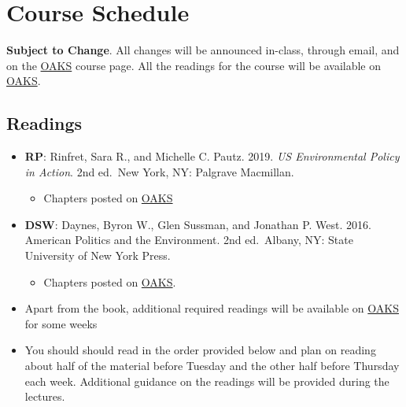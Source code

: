 \hypertarget{course-schedule}{%
\section{Course Schedule}\label{course-schedule}}

\textbf{Subject to Change}. All changes will be announced in-class,
through email, and on the \href{https://lms.cofc.edu}{OAKS} course page.
All the readings for the course will be available on
\href{https://lms.cofc.edu}{OAKS}.

\hypertarget{readings}{%
\subsection{Readings}\label{readings}}

\begin{itemize}
\item
  \faBook \hspace{0.005in} \textbf{RP}: Rinfret, Sara R., and Michelle
  C. Pautz. 2019. \emph{US Environmental Policy in Action}. 2nd ed.~New
  York, NY: Palgrave Macmillan.

  \begin{itemize}
  
  \item
    Chapters posted on \href{https://lms.cofc.edu}{OAKS}
  \end{itemize}
\item
  \faBook \hspace{0.005in} \textbf{DSW}: Daynes, Byron W., Glen Sussman,
  and Jonathan P. West. 2016. American Politics and the Environment. 2nd
  ed.~Albany, NY: State University of New York Press.

  \begin{itemize}
  
  \item
    Chapters posted on \href{https://lms.cofc.edu}{OAKS}.
  \end{itemize}
\item
  Apart from the book, additional required readings will be available on
  \href{https://lms.cofc.edu}{OAKS} for some weeks
\item
  You should should read in the order provided below and plan on reading
  about half of the material before Tuesday and the other half before
  Thursday each week. Additional guidance on the readings will be
  provided during the lectures.
\end{itemize}

\SetDate[04/01/2022]


